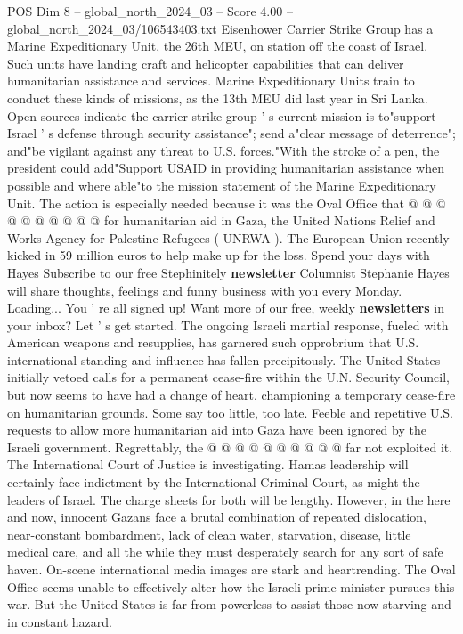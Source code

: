 \begin{textsample}{POS Dim 8 – global\_north\_2024\_03 – Score 4.00 – global\_north\_2024\_03/106543403.txt}
Eisenhower Carrier Strike Group has a Marine Expeditionary Unit, the 26th MEU, on station off the coast of Israel.
Such units have landing craft and helicopter capabilities that can deliver humanitarian assistance and services.
Marine Expeditionary Units train to conduct these kinds of missions, as the 13th MEU did last year in Sri Lanka.
Open sources indicate the carrier strike group ' s current mission is to"support Israel ' s defense through security assistance"; send a"clear message of deterrence"; and"be vigilant against any threat to U.S. forces."With the stroke of a pen, the president could add"Support USAID in providing humanitarian assistance when possible and where able"to the mission statement of the Marine Expeditionary Unit.
The action is especially needed because it was the Oval Office that @ @ @ @ @ @ @ @ @ @ for humanitarian aid in Gaza, the United Nations Relief and Works Agency for Palestine Refugees ( UNRWA ).
The European Union recently kicked in 59 million euros to help make up for the loss.
Spend your days with Hayes Subscribe to our free Stephinitely \textbf{newsletter} Columnist Stephanie Hayes will share thoughts, feelings and funny business with you every Monday.
Loading...
You ' re all signed up!
Want more of our free, weekly \textbf{newsletters} in your inbox?
Let ' s get started.
The ongoing Israeli martial response, fueled with American weapons and resupplies, has garnered such opprobrium that U.S. international standing and influence has fallen precipitously.
The United States initially vetoed calls for a permanent cease-fire within the U.N.
Security Council, but now seems to have had a change of heart, championing a temporary cease-fire on humanitarian grounds.
Some say too little, too late.
Feeble and repetitive U.S. requests to allow more humanitarian aid into Gaza have been ignored by the Israeli government.
Regrettably, the @ @ @ @ @ @ @ @ @ @ far not exploited it.
The International Court of Justice is investigating.
Hamas leadership will certainly face indictment by the International Criminal Court, as might the leaders of Israel.
The charge sheets for both will be lengthy.
However, in the here and now, innocent Gazans face a brutal combination of repeated dislocation, near-constant bombardment, lack of clean water, starvation, disease, little medical care, and all the while they must desperately search for any sort of safe haven.
On-scene international media images are stark and heartrending.
The Oval Office seems unable to effectively alter how the Israeli prime minister pursues this war.
But the United States is far from powerless to assist those now starving and in constant hazard.

\end{textsample}
